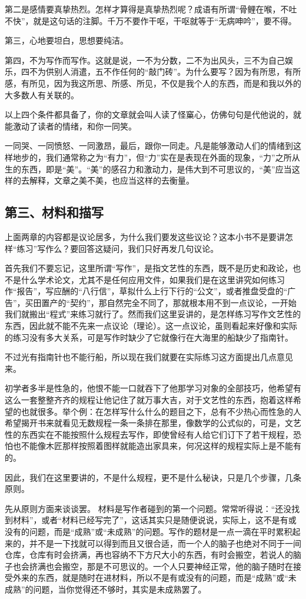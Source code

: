 \documentclass[12pt,a5paper]{ctexbook}
\begin{document}
第二是感情要真挚热烈。怎样才算得是真挚热烈呢？成语有所谓“骨鲤在喉，不吐不快”，就是这句话的注脚。千万不要作干呕，干呕就等于“无病呻吟”，要不得。

第三，心地要坦白，思想要纯洁。

第四，不为写作而写作。这就是说，一不为分数，二不为出风头，三不为自己娱乐，四不为供别人消遣，五不作任何的“敲门砖”。为什么要写？因为有所思，有所感，有所见，因为我这所思、所感、所见，不仅是我个人的东西，而是和我以外的大多数人有关联的。

以上四个条件都具备了，你的文章就会叫人读了怪窼心，仿佛句句是代他说的，就能激动了读者的情绪，和你一同笑。

一同哭、一同愤怒、一同激昂，最后，跟你一同走。凡是能够激动人们的情绪到这样地步的，我们通常称之为“有力”，但“力”实在是表现在外面的现象，“力”之所从生的东西，即是“美”。“美”的感召力和激动力，是伟大到不可思议的，“美”应当这样的去解释，文章之美不美，也应当这样的去衡量。

\subsection{第三、材料和描写}
上面两章的内容都是议论居多，为什么我们要发这些议论？这本小书不是要讲怎样“练习”写作么？要回答这疑问，我们只好再发几句议论。

首先我们不要忘记，这里所谓“写作”，是指文艺性的东西，既不是历史和政论，也不是什么学术论文，尤其不是任何应用文件，如果我们是在这里讲究如何练习作“报告”，写应酬的“八行信”，草拟什么上行下行的“公文”，或者推盘受盘的“广告”，买田置产的“契约”，那自然完全不同了，那就根本用不到一点议论，一开始我们就搬出“程式”来练习就行了。然而我们这里妥讲的，是怎样练习写作文艺性的东西，因此就不能不先来一点议论（理论）。这一点议论，虽则看起来好像和实际的练习没有多大关系，可是写作时缺少了它就像行在大海里的船缺少了指南针。

不过光有指南针也不能行船，所以现在我们就要在实际练习这方面提出几点意见来。

初学者多半是性急的，他恨不能一口就吞下了他那学习对象的全部技巧，他希望有这么一套整整齐齐的规程让他记住了就万事大吉，对于文艺性的东西，抱着这样希望的也就很多。举个例：在怎样写什么什么的题目之下，总有不少热心而性急的人希望揭开书来就看见无数规程一条一条排在那里，像数学的公式似的，可是，文艺性的东西实在不能按照什么规程去写作，即使曾经有人给它们订下了若干规程，恐怕也不能像木匠那样按照着图样就能造出家具来，何况这样的规程实际上是不能有的。

因此，我们在这里要讲的，不是什么规程，更不是什么秘诀，只是几个步骤，几条原则。

先从原则方面来谈谈罢。
材料是写作者碰到的第一个问题。常常听得说：“还没找到材料”，或者“材料已经写完了”，这话其实只是随便说说，实际上，这不是有或没有的问题，而是“成熟”或“未成熟”的问题。写作的题材是一点一滴在平时累积起来的，并不是一下找就可以得到而且又很合适，而一个人的脑子也绝对不同于一间仓库，仓库有时会挤满，再也容纳不下方尺大小的东西，有时会搬空，若说人的脑子也会挤满也会搬空，那是不可思议的。一个人只要神经正常，他的脑子随时在接受外来的东西，就是随时在进材料，所以不是有或没有的问题，而是“成熟”或“未成熟”的问题，当你觉得还不够时，其实是未成熟罢了。
\end{document}
